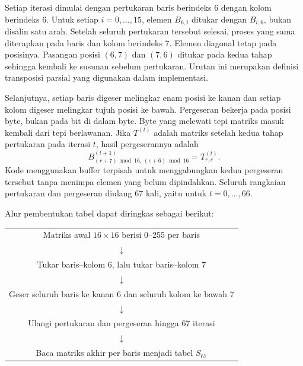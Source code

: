 Setiap iterasi dimulai dengan pertukaran baris berindeks 6 dengan kolom
berindeks 6. Untuk setiap $i=0,\ldots,15$, elemen $B_{6,i}$ ditukar
dengan $B_{i,6}$, bukan disalin satu arah. Setelah seluruh pertukaran
tersebut selesai, proses yang sama diterapkan pada baris dan kolom
berindeks 7. Elemen diagonal tetap pada posisinya. Pasangan posisi
$(6,7)$ dan $(7,6)$ ditukar pada kedua tahap sehingga kembali ke
susunan sebelum pertukaran. Urutan ini merupakan definisi transposisi
parsial yang digunakan dalam implementasi.

Selanjutnya, setiap baris digeser melingkar enam posisi ke kanan dan
setiap kolom digeser melingkar tujuh posisi ke bawah. Pergeseran bekerja
pada posisi byte, bukan pada bit di dalam byte. Byte yang melewati tepi
matriks masuk kembali dari tepi berlawanan. Jika $T^{(t)}$ adalah matriks
setelah kedua tahap pertukaran pada iterasi $t$, hasil pergeserannya adalah
\begin{equation}
  B^{(t+1)}_{(r+7)\bmod16,\,(c+6)\bmod16}=T^{(t)}_{r,c}.
\end{equation}
Kode menggunakan buffer terpisah untuk menggabungkan kedua pergeseran
tersebut tanpa menimpa elemen yang belum dipindahkan. Seluruh rangkaian
pertukaran dan pergeseran diulang 67 kali, yaitu untuk $t=0,\ldots,66$.

Alur pembentukan tabel dapat diringkas sebagai berikut:
\begin{center}
\begin{tabular}{c}
Matriks awal $16\times16$ berisi 0--255 per baris\\
$\downarrow$\\
Tukar baris--kolom 6, lalu tukar baris--kolom 7\\
$\downarrow$\\
Geser seluruh baris ke kanan 6 dan seluruh kolom ke bawah 7\\
$\downarrow$\\
Ulangi pertukaran dan pergeseran hingga 67 iterasi\\
$\downarrow$\\
Baca matriks akhir per baris menjadi tabel $S_{67}$
\end{tabular}
\end{center}


